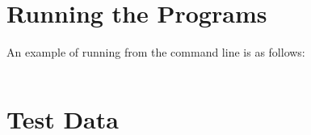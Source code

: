 \documentclass{l4proj}
\begin{document}
\begin{appendices}

\chapter{Running the Programs}
An example of running from the command line is as follows:
\begin{verbatim}
\end{verbatim}

\chapter{Test Data}

\end{appendices}




\end{document}
